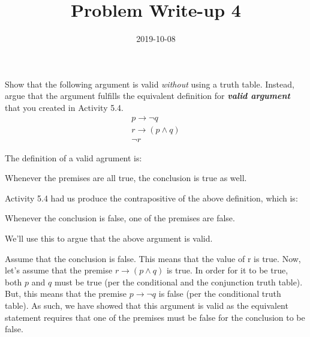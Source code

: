 \documentclass[a4paper,12pt]{article}
\title{Problem Write-up 4}
\date{2019-10-08}
\begin{document}
    \begin{problem}
        Show that the following argument is valid \textit{without} using a truth table. Instead, argue that the argument fulfills the equivalent definition for \textbf{\textit{valid argument}} that you created in Activity 5.4.
        \[
            \begin{array}{l}
                p \rightarrow \neg q \\
                r \rightarrow (p \wedge q) \\ \hline
                \neg r
            \end{array}
        \]
    \end{problem}
    \begin{answer}
        The definition of a valid agrument is:

        \begin{displayquote}
            Whenever the premises are all true, the conclusion is true as well.
        \end{displayquote}

        Activity 5.4 had us produce the contrapositive of the above definition, which is:

        \begin{displayquote}
            Whenever the conclusion is false, one of the premises are false.
        \end{displayquote}
        
        We'll use this to argue that the above argument is valid.

        Assume that the conclusion is false. This means that the value of r is true. Now, let's assume that the premise \(r \rightarrow (p \wedge q)\) is true. In order for it to be true, both \(p\) and \(q\) must be true (per the conditional and the conjunction truth table). But, this means that the premise \(p \rightarrow \neg q\) is false (per the conditional truth table). As such, we have showed that this argument is valid as the equivalent statement requires that one of the premises must be false for the conclusion to be false.
    \end{answer}
\end{document}
